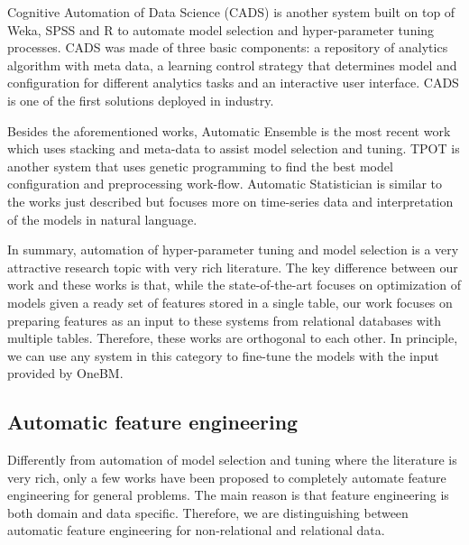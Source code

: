Cognitive Automation of Data Science (CADS) \cite{cads,read} is another system built on top of Weka, SPSS and R to automate model selection and hyper-parameter tuning processes. CADS was made of three basic components: a repository of analytics algorithm with meta data, a learning control strategy that determines model and configuration for different analytics tasks and an interactive user interface. CADS is one of the first solutions deployed in industry. 

Besides the aforementioned works, Automatic Ensemble \cite{ensemble} is the most recent work which uses stacking and meta-data to assist model selection and tuning. TPOT \cite{tpot} is another system that uses genetic programming to find the best model configuration and preprocessing work-flow. Automatic Statistician \cite{autostatistician} is similar to the works just described but focuses more on time-series data and interpretation of the models in natural language.

In summary, automation of hyper-parameter tuning and model selection is a very attractive research topic with very rich literature. The key difference between our work and these works is that, while the state-of-the-art focuses on optimization of models given a ready set of features stored in a single table, our work focuses on preparing features as an input to these systems from relational databases with multiple tables. Therefore, these works are orthogonal to each other. In principle, we can use any system in this category to fine-tune the models with the input provided by OneBM.

\subsection{Automatic feature engineering}
Differently from automation of model selection and tuning where the literature is very rich, only a few works have been proposed to completely automate feature engineering for general problems. The main reason is that feature engineering is both domain and data specific. Therefore, we are distinguishing between automatic feature engineering for non-relational and relational data.


